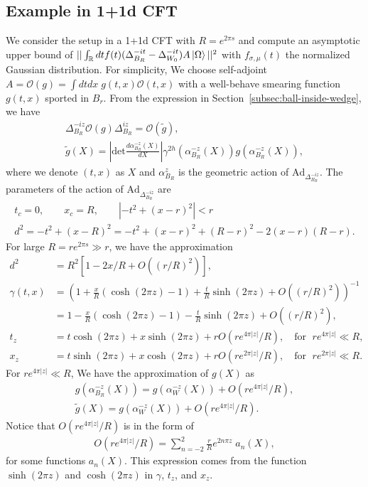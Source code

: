 \documentclass[a4paper,11pt]{article}
\theoremstyle{definition}
\begin{document}
\subsection{Example in 1+1d CFT}
We consider the setup in a 1+1d CFT with $R = e^{2\pi s}$ and compute an asymptotic upper bound of $||\int_\mathbb{R} dt f(t)(\Delta_{B_R}^{-it} - \Delta_{W_0}^{-it})A\ket{\Omega}||^2$ with $f_{\sigma,\mu}(t)$ the normalized Gaussian distribution. For simplicity, We choose self-adjoint $A = \mathcal{O}(g) = \int dtdx \;g(t,x) \mathcal{O}(t,x)$ with a well-behave smearing function $g(t,x)$ sported in $B_{r}$. From the expression in Section~\ref{subsec:ball-inside-wedge}, we have 
\begin{gather}
    \Delta_{B_R}^{-iz} \mathcal{O}(g) \Delta_{B_R}^{iz} = \mathcal{O}(\tilde{g}),\\
    \tilde{g}(X) = \left|\text{det}\frac{d\alpha_{B_R}^{-z}(X)}{dX}\right|\gamma^{2h}(\alpha_{B_R}^{-z}(X)) g(\alpha_{B_R}^{-z}(X)),
\end{gather}
where we denote $(t,x)$ as $X$ and $\alpha_{B_R}^{z}$ is the geometric action of $\text{Ad}_{ \Delta_{B_R}^{-iz}}$. The parameters of the action of $\text{Ad}_{\Delta_{B_R}^{-iz}}$ are
\begin{gather}
    t_c = 0, \qquad x_c  = R, \qquad 
    |-t^2 + (x-r)^2| < r\\
    d^2 = -t^2 +(x-R)^2 = -t^2 + (x-r)^2 +(R-r)^2 - 2(x-r)(R-r).
\end{gather}
For large $R=re^{2\pi s}\gg r$, we have the approximation
\begin{align}
    d^2 &= R^2\left[1 -2x/R +O({(r/R)}^2)\right],\\
    \gamma(t,x)&= \left(1 + \frac{x}{R}(\cosh(2\pi z) -1)+\frac{t}{R}\sinh (2\pi z) + O((r/R)^2)\right)^{-1}\nonumber\\
    &= 1 - \frac{x}{R}(\cosh(2\pi z) -1)-\frac{t}{R}\sinh (2\pi z) + O((r/R)^2),\\
    t_z &= t\cosh (2\pi z) + x\sinh (2\pi z) + r O(re^{4\pi|z|}/R), \quad \text{for } \;re^{4\pi|z|}\ll R,\\
    x_z &= t\sinh (2\pi z) + x\cosh (2\pi z) + r O(re^{2\pi|z|}/R), \quad \text{for } \;re^{2\pi|z|}\ll R.
\end{align}
For $re^{4\pi|z|}\ll R$, We have the approximation of $g(X)$ as
\begin{gather}
    g(\alpha_{B_R}^{-z}(X)) = g(\alpha_{W}^{-z}(X)) + O(re^{4\pi|z|}/R),\\
    \tilde{g}(X) = g(\alpha_{W}^{-z}(X)) + O(re^{4\pi|z|}/R).
\end{gather}
Notice that $O(re^{4\pi|z|}/R)$ is in the form of
\begin{align}
    O(re^{4\pi|z|}/R) = \sum_{n=-2}^2\frac{r}{R} e^{2n\pi z} \; a_n(X),
\end{align}
for some functions $a_n(X)$. This expression comes from the function $\sinh(2\pi z)$ and $\cosh(2\pi z)$ in $\gamma$, $t_z$, and $x_z$.
\end{document}
